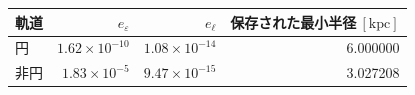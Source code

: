 \begin{tabular}{lrrr}\toprule
軌道 & $e_\varepsilon$ & $e_\ell$ & 保存された最小半径$\ [\mathrm{kpc}]$ \\
\midrule
円 & $1.62\times 10^{-10}$ & $1.08\times 10^{-14}$ & 6.000000 \\
非円 & $1.83\times 10^{-5}$ & $9.47\times 10^{-15}$ & 3.027208 \\
\bottomrule\end{tabular}
